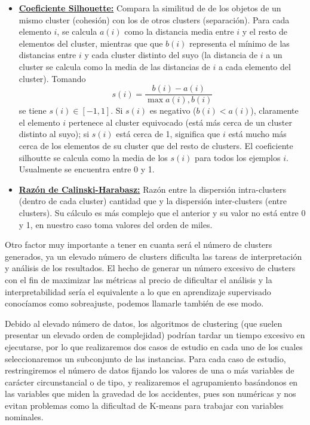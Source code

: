 \documentclass[oneside]{book}
\begin{document}
\begin{itemize}
\item \href{https://en.wikipedia.org/wiki/Silhouette_%28clustering%29}
    {\textbf{Coeficiente Silhouette:}} Compara la similitud de de los
    objetos de un mismo cluster (cohesión) con los de otros clusters
    (separación). Para cada elemento $i$, se calcula $a(i)$ como la
    distancia media entre $i$ y el resto de elementos del cluster,
    mientras que que $b(i)$ representa el mínimo de las distancias
    entre $i$ y cada cluster distinto del suyo (la distancia de $i$ a
    un cluster se calcula como la media de las distancias de $i$ a
    cada elemento del cluster). Tomando
    \[s(i)=\frac{b(i)-a(i)}{\max{a(i),b(i)}}\] se tiene
    $s(i)\in[-1,1]$. Si $s(i)$ es negativo \big($b(i)<a(i)$\big),
    claramente el elemento $i$ pertenece al cluster equivocado (está
    más cerca de un cluster distinto al suyo); si $s(i)$ está cerca de
    1, significa que $i$ está mucho más cerca de los elementos de su
    cluster que del resto de clusters. El coeficiente silhoutte se
    calcula como la media de los $s(i)$ para todos los ejemplos
    $i$. Usualmente se encuentra entre 0 y 1.

  \item
    \href{https://www.tandfonline.com/doi/pdf/10.1080/03610927408827101?needAccess=true}{\textbf{Razón
        de Calinski-Harabasz:}} Razón entre la dispersión
    intra-clusters (dentro de cada cluster) cantidad que y la
    dispersión inter-clusters (entre clusters). Su cálculo es más
    complejo que el anterior y su valor no está entre 0 y 1, en
    nuestro caso toma valores del orden de miles.
  \end{itemize}

  Otro factor muy importante a tener en cuanta será el número de
  clusters generados, ya un elevado número de clusters dificulta las
  tareas de interpretación y análisis de los resultados. El hecho de
  generar un número excesivo de clusters con el fin de maximizar las
  métricas al precio de dificultar el análisis y la interpretabilidad
  sería el equivalente a lo que en aprendizaje supervisado conocíamos
  como sobreajuste, podemos llamarle también de ese modo.

  Debido al elevado número de datos, los algoritmos de clustering (que
  suelen presentar un elevado orden de complejidad) podrían tardar un
  tiempo excesivo en ejecutarse, por lo que realizaremos dos casos de
  estudio en cada uno de los cuales seleccionaremos un subconjunto de
  las instancias. Para cada caso de estudio, restringiremos el número
  de datos fijando los valores de una o más variables de carácter
  circunstancial o de tipo, y realizaremos el agrupamiento basándonos
  en las variables que miden la gravedad de los accidentes, pues son
  numéricas y nos evitan problemas como la dificultad de K-means para
  trabajar con variables nominales.
\end{document}
